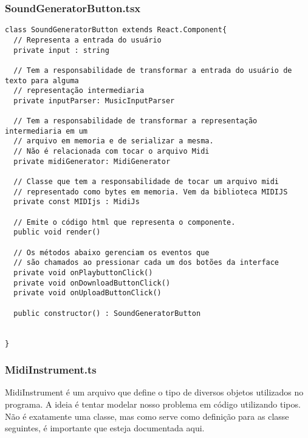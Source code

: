 \documentclass[12pt]{article}
\begin{document}
\subsubsection{SoundGeneratorButton.tsx}
\begin{verbatim}
class SoundGeneratorButton extends React.Component{
  // Representa a entrada do usuário
  private input : string
  
  // Tem a responsabilidade de transformar a entrada do usuário de texto para alguma 
  // representação intermediaria 
  private inputParser: MusicInputParser
  
  // Tem a responsabilidade de transformar a representação intermediaria em um 
  // arquivo em memoria e de serializar a mesma.
  // Não é relacionada com tocar o arquivo Midi
  private midiGenerator: MidiGenerator
  
  // Classe que tem a responsabilidade de tocar um arquivo midi
  // representado como bytes em memoria. Vem da biblioteca MIDIJS
  private const MIDIjs : MidiJs

  // Emite o código html que representa o componente. 
  public void render()
  
  // Os métodos abaixo gerenciam os eventos que
  // são chamados ao pressionar cada um dos botões da interface
  private void onPlaybuttonClick()
  private void onDownloadButtonClick()
  private void onUploadButtonClick()
  
  public constructor() : SoundGeneratorButton


}

\end{verbatim}

\subsubsection{MidiInstrument.ts}

MidiInstrument é um arquivo que define o tipo de diversos objetos utilizados no programa. A ideia é tentar modelar nosso problema em código utilizando tipos. Não é exatamente uma classe, mas como serve como definição para as classe seguintes, é importante que esteja documentada aqui.
\end{document}
